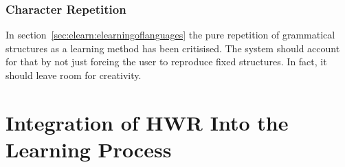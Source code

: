 










\subsubsection{Character Repetition}
\label{sec:concept:characterrepetition} %

In section~\ref{sec:elearn:elearningoflanguages} the pure repetition of 
grammatical structures as a learning method has been critisised.
The system should account for that by not just forcing the user to
reproduce fixed structures. In fact, it should leave room for creativity.


\section{Integration of HWR Into the Learning Process}
\label{sec:concept:integrationofhwrintolearning}

